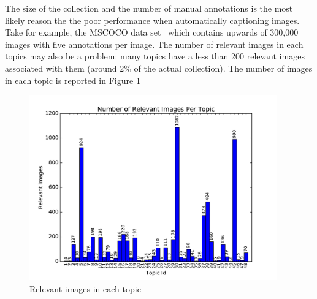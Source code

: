The size of the collection and the number of manual annotations is the most likely reason the the poor performance when automatically captioning images. Take for example, the MSCOCO data set~\cite{lin2014microsoft} which contains upwards of 300,000 images with five annotations per image. The number of relevant images in each topics may also be a problem: many topics have a less than 200 relevant images associated with them (around 2\% of the actual collection). The number of images in each topic is reported in Figure \ref{fig:relevant-images}

\begin{figure}[h]
    \centering
    \includegraphics[width=0.95\textwidth]{graphs/relevant-images}
    \caption{Relevant images in each topic}
    \label{fig:relevant-images}
\end{figure}






